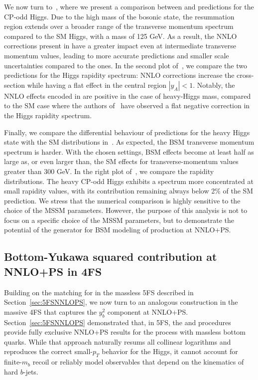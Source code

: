 \documentclass[11pt,a4paper]{article}
\begin{document}
We now turn to~, where we present a comparison between \minnlo{}  and \minlo{} predictions for the CP-odd Higgs. Due to the high mass of the bosonic state, the resummation region extends over a broader range of the transverse momentum spectrum compared to the SM Higgs, with a mass of 125 GeV. As a result, the NNLO corrections present in \minnlo{} have a greater impact even at intermediate transverse momentum values, leading to more accurate predictions and smaller scale uncertainties compared to the \minlo{} ones. In the second plot of~, we compare the two predictions for the Higgs rapidity spectrum: NNLO corrections increase the cross-section while having a flat effect in the central region $|y_A|<1$. Notably, the NNLO effects encoded in \minnlo{} are positive in the case of heavy-Higgs mass, compared to the SM case where the authors of~ have observed a flat negative correction in the Higgs rapidity spectrum.

Finally, we compare the differential behaviour of \minnlo{} predictions for the heavy Higgs state with the SM distributions in~. As expected, the BSM transverse momentum spectrum is harder. With the chosen settings, BSM effects become at least half as large as, or even larger than, the SM effects for transverse-momentum values greater than 300 GeV. In the right plot of~, we compare the rapidity distributions. The heavy CP-odd Higgs exhibits a spectrum more concentrated at small rapidity values, with its contribution remaining always below 2\% of the SM prediction. We stress that the numerical comparison is highly sensitive to the choice of the MSSM parameters. However, the purpose of this analysis is not to focus on a specific choice of the MSSM parameters, but to demonstrate the potential of the \minnlo{} generator for BSM modeling of \bbH{} production at NNLO+PS.

\subsection{Bottom-Yukawa squared contribution at NNLO+PS in 4FS}\label{sec:bbH4FS}
Building on the \minnlo{} matching for \bbH{} in the massless 5FS described in Section~\ref{sec:5FSNNLOPS}, we now turn to an analogous construction in the massive 4FS that captures the \(y_{b}^{2}\) component at NNLO+PS. 
Section~\ref{sec:5FSNNLOPS} demonstrated that, in 5FS, the \minnlo{} and \GENEVA{} procedures provide fully exclusive NNLO+PS results for the \bbH{} process with massless bottom quarks. While that approach naturally resums all collinear logarithms and reproduces the correct small-\(p_{T}\) behavior for the Higgs, it cannot account for finite-\(m_{b}\) recoil or reliably model observables that depend on the kinematics of hard \(b\)-jets.
\end{document}
